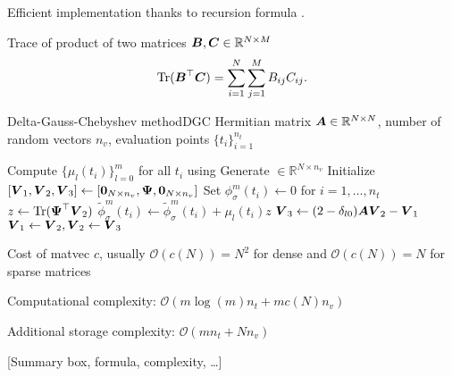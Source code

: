 Efficient implementation thanks to recursion formula .

Trace of product of two matrices $\boldsymbol{B}, \boldsymbol{C} \in \mathbb{R}^{N \times M}$
\begin{equation}
    \operatorname{Tr}(\boldsymbol{B}^{\top}\boldsymbol{C}) = \sum_{i=1}^{N} \sum_{j=1}^{M} B_{ij} C_{ij}.
    \label{equ:2-chebyshev-fast-trace}
\end{equation}

\begin{algo}{Delta-Gauss-Chebyshev method}{DGC}
    Hermitian matrix $\boldsymbol{A} \in \mathbb{R}^{N \times N}$, number of random vectors $n_v$,
    evaluation points $\{t_i\}_{i=1}^{n_t}$
    \begin{algorithmic}[1]
        \State Compute $\{\mu_l(t_i)\}_{l=0}^m$ for all $t_i$ using 
        \State Generate  $\in \mathbb{R}^{N \times n_v}$
        \State Initialize $[\boldsymbol{V}_1, \boldsymbol{V}_2, \boldsymbol{V}_3] \gets [\boldsymbol{0}_{N \times n_v}, \boldsymbol{\Psi}, \boldsymbol{0}_{N \times n_v}]$
        \State Set ${\phi}_{\sigma}^m(t_i) \gets 0$ for $i=1,\dots,n_t$
          \State $z \gets \operatorname{Tr}(\boldsymbol{\Psi}^{\top} \boldsymbol{V}_2)$
            \State $\widetilde{\phi}_{\sigma}^m(t_i) \gets \widetilde{\phi}_{\sigma}^m(t_i) + \mu_l(t_i) z$
          \EndFor
          \State $\boldsymbol{V}_3 \gets (2 - \delta_{l0}) \boldsymbol{A} \boldsymbol{V}_2 - \boldsymbol{V}_1$ 
          \State $\boldsymbol{V}_1 \gets \boldsymbol{V}_2, \boldsymbol{V}_2 \gets \boldsymbol{V}_3$
        \EndFor
    \end{algorithmic}
\end{algo}

Cost of matvec $c$, usually $\mathcal{O}(c(N)) = N^2$ for dense and
$\mathcal{O}(c(N)) = N$ for sparse matrices

Computational complexity: $\mathcal{O}(m \log(m) n_t + m c(N) n_v)$

Additional storage complexity: $\mathcal{O}(m n_t + N n_v)$

[Summary box, formula, complexity, \dots]